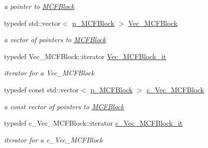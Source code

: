 \begin{DoxyCompactItemize}
\begin{DoxyCompactList}\small\item\em a pointer to \mbox{\hyperlink{class_s_m_spp__di__unipi__it_1_1_m_c_f_block}{M\+C\+F\+Block}} \end{DoxyCompactList}\item 
typedef std\+::vector$<$ \mbox{\hyperlink{group___m_c_f_block___t_y_p_e_s_gadd093efb785d0de13da72a397653b760}{p\+\_\+\+M\+C\+F\+Block}} $>$ \mbox{\hyperlink{group___m_c_f_block___t_y_p_e_s_ga7908bbe51ed80987fa3c35ab2ecb1eb7}{Vec\+\_\+\+M\+C\+F\+Block}}
\begin{DoxyCompactList}\small\item\em a vector of pointers to \mbox{\hyperlink{class_s_m_spp__di__unipi__it_1_1_m_c_f_block}{M\+C\+F\+Block}} \end{DoxyCompactList}\item 
typedef Vec\+\_\+\+M\+C\+F\+Block\+::iterator \mbox{\hyperlink{group___m_c_f_block___t_y_p_e_s_gad2e511b38af95db398828a279337a270}{Vec\+\_\+\+M\+C\+F\+Block\+\_\+it}}
\begin{DoxyCompactList}\small\item\em iterator for a Vec\+\_\+\+M\+C\+F\+Block \end{DoxyCompactList}\item 
typedef const std\+::vector$<$ \mbox{\hyperlink{group___m_c_f_block___t_y_p_e_s_gadd093efb785d0de13da72a397653b760}{p\+\_\+\+M\+C\+F\+Block}} $>$ \mbox{\hyperlink{group___m_c_f_block___t_y_p_e_s_ga00d6e7a4b4f82c756f3a49a60565947b}{c\+\_\+\+Vec\+\_\+\+M\+C\+F\+Block}}
\begin{DoxyCompactList}\small\item\em a const vector of pointers to \mbox{\hyperlink{class_s_m_spp__di__unipi__it_1_1_m_c_f_block}{M\+C\+F\+Block}} \end{DoxyCompactList}\item 
typedef c\+\_\+\+Vec\+\_\+\+M\+C\+F\+Block\+::iterator \mbox{\hyperlink{group___m_c_f_block___t_y_p_e_s_gabbeb5c1581a15a31c50b4adb6dffa6f3}{c\+\_\+\+Vec\+\_\+\+M\+C\+F\+Block\+\_\+it}}
\begin{DoxyCompactList}\small\item\em iterator for a c\+\_\+\+Vec\+\_\+\+M\+C\+F\+Block \end{DoxyCompactList}\end{DoxyCompactItemize}
